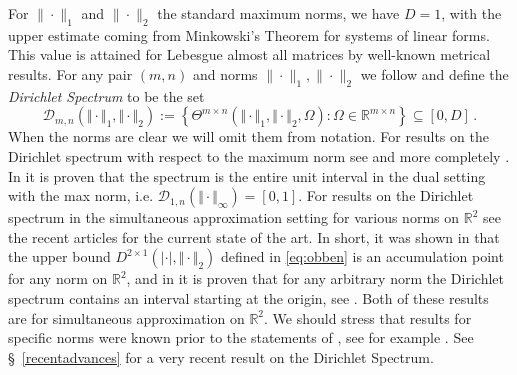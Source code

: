 \documentclass[10pt]{amsart}
\theoremstyle{definition}
\newcommand{\R}{\mathbb{R}}
\begin{document}
For $\|\cdot\|_{1}$ and $\|\cdot\|_{2}$ the standard maximum norms, we have $D=1$, with the upper estimate coming from Minkowski's Theorem for systems of linear forms. This value is attained for Lebesgue almost all matrices by well-known metrical results. For any pair $(m,n)$ and norms $\|\cdot\|_{1},\|\cdot\|_{2}$ we follow \cite{akmo} and define the \textit{Dirichlet Spectrum} to be the set
\begin{equation} \label{eq:dirspe}
    \mathcal{D}_{m,n}(\Vert\cdot\Vert_1,\Vert\cdot\Vert_2):= \left\{ \Theta^{m\times n}(\Vert\cdot\Vert_1,\Vert\cdot\Vert_2,\Omega) : \Omega \in \R^{m\times n} \right\} \subseteq [0,D]\, .
\end{equation}
When the norms are clear we will omit them from notation. For results on the Dirichlet spectrum with respect to the maximum norm see \cite[Appendix]{j1} and more completely \cite{j2}. In \cite{j2} it is proven that the spectrum is the entire unit interval in the dual setting with the max norm,
i.e. $\mathcal{D}_{1,n}(\Vert\cdot\Vert_{\infty})=[0,1]$. For results on the Dirichlet spectrum in the simultaneous approximation setting for various norms on $\R^{2}$ see the recent articles \cite{algo, kleinbock} for the current state of the art. In short, it was shown in \cite[Corollary 1.2]{kleinbock} that the upper bound $D^{2\times 1}(\vert\cdot\vert,\Vert\cdot\Vert_2)$ defined in \eqref{eq:obben} is an accumulation point for any norm on $\R^2$, and in \cite{algo} it is proven that for any arbitrary norm the Dirichlet spectrum contains an interval starting at the origin, see \cite[Corollary 1]{algo}. Both of these results are for simultaneous approximation on $\R^{2}$. We should stress that results for specific norms were known prior to the statements of \cite{algo,kleinbock}, see for example \cite{akmo, akh,j1}. See \S~\ref{recentadvances} for a very recent result on the Dirichlet Spectrum. \par
\end{document}
